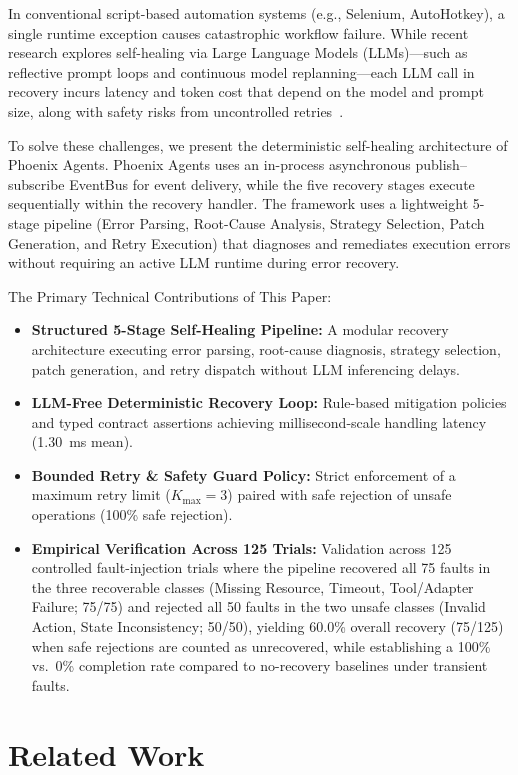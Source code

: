 \documentclass[conference]{IEEEtran}
\begin{document}
In conventional script-based automation systems (e.g., Selenium, AutoHotkey), a single runtime exception causes catastrophic workflow failure. While recent research explores self-healing via Large Language Models (LLMs)---such as reflective prompt loops and continuous model replanning---each LLM call in recovery incurs latency and token cost that depend on the model and prompt size, along with safety risks from uncontrolled retries~\cite{babu2026,jeong2026}.

To solve these challenges, we present the deterministic self-healing architecture of Phoenix Agents. Phoenix Agents uses an in-process asynchronous publish--subscribe EventBus for event delivery, while the five recovery stages execute sequentially within the recovery handler. The framework uses a lightweight 5-stage pipeline (Error Parsing, Root-Cause Analysis, Strategy Selection, Patch Generation, and Retry Execution) that diagnoses and remediates execution errors without requiring an active LLM runtime during error recovery.

The Primary Technical Contributions of This Paper:
\begin{itemize}
    \item \textbf{Structured 5-Stage Self-Healing Pipeline:} A modular recovery architecture executing error parsing, root-cause diagnosis, strategy selection, patch generation, and retry dispatch without LLM inferencing delays.
    \item \textbf{LLM-Free Deterministic Recovery Loop:} Rule-based mitigation policies and typed contract assertions achieving millisecond-scale handling latency (1.30~ms mean).
    \item \textbf{Bounded Retry \& Safety Guard Policy:} Strict enforcement of a maximum retry limit ($K_{\text{max}} = 3$) paired with safe rejection of unsafe operations (100\% safe rejection).
    \item \textbf{Empirical Verification Across 125 Trials:} Validation across 125 controlled fault-injection trials where the pipeline recovered all 75 faults in the three recoverable classes (Missing Resource, Timeout, Tool/Adapter Failure; 75/75) and rejected all 50 faults in the two unsafe classes (Invalid Action, State Inconsistency; 50/50), yielding 60.0\% overall recovery (75/125) when safe rejections are counted as unrecovered, while establishing a 100\% vs.\ 0\% completion rate compared to no-recovery baselines under transient faults.
\end{itemize}

\section{Related Work}
\end{document}
